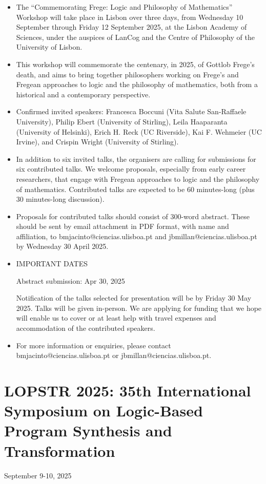 \documentclass[prodmode,acmtecs]{acmsmall} %
\begin{document}
\begin{itemize}\item  The “Commemorating Frege: Logic and Philosophy of Mathematics” Workshop will take place in Lisbon over three days, from Wednesday 10 September through Friday 12 September 2025, at the Lisbon Academy of Sciences, under the auspices of LanCog and the Centre of Philosophy of the University of Lisbon. 
 
\item  This workshop will commemorate the centenary, in 2025, of Gottlob Frege’s death, and aims to bring together philosophers working on Frege's and Fregean approaches to logic and the philosophy of mathematics, both from a historical and a contemporary perspective.  
 
\item  Confirmed invited speakers: Francesca Boccuni (Vita Salute San-Raffaele University), Philip Ebert (University of Stirling), Leila Haaparanta (University of Helsinki), Erich H. Reck (UC Riverside), Kai F. Wehmeier (UC Irvine), and Crispin Wright (University of Stirling). 
 
\item  In addition to six invited talks, the organisers are calling for submissions for six contributed talks. We welcome  proposals, especially from early career researchers, that engage with Fregean approaches to logic and the philosophy of mathematics. Contributed talks are expected to be 60 minutes-long (plus 30 minutes-long discussion). 
 
\item  Proposals for contributed talks should consist of 300-word abstract. These should be sent by email attachment in PDF format, with name and affiliation, to bmjacinto@ciencias.ulisboa.pt and jbmillan@ciencias.ulisboa.pt by Wednesday 30 April 2025.  
 
\item IMPORTANT DATES 
 
Abstract submission: Apr 30, 2025 
 
  Notification of the talks selected for presentation will be by Friday 30 May 2025.  Talks will be given in-person. We are applying for funding that we hope will enable us to cover or at least help with travel expenses and accommodation of the contributed speakers.   
 
\item  For more information or enquiries, please contact bmjacinto@ciencias.ulisboa.pt or jbmillan@ciencias.ulisboa.pt.  
 
\end{itemize}\section{LOPSTR 2025: 35th International Symposium on Logic-Based Program Synthesis and Transformation }\label{LOPSTR2025}  September 9-10, 2025 \\ 
\end{document}
